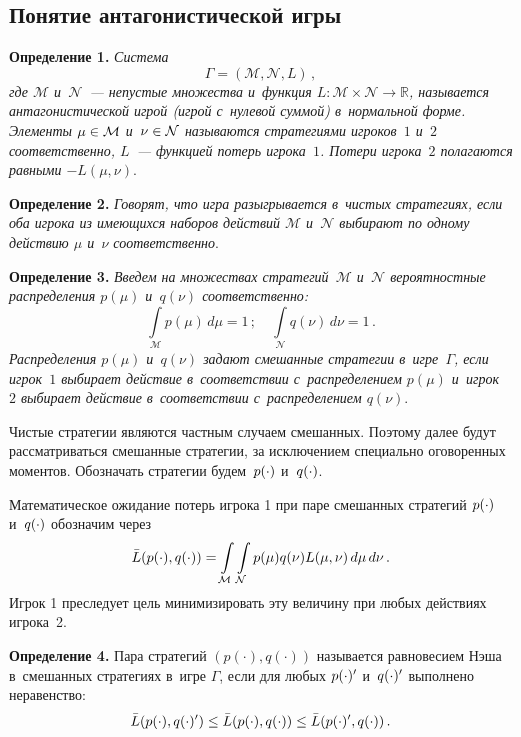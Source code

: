 \begin{multicols}{2}
\subsection{Понятие антагонистической игры}

\noindent
\textbf{Определение 1.} %
\textit{Система
$$
    \Gamma = (\mathcal{M}, \mathcal{N}, L)\,,
$$
где $\mathcal{M}$ и~$\mathcal{N}$~--- непустые множества и~функция $L \colon \mathcal{M}
\times \mathcal{N} \to \mathbb{R}$, называется антагонистической игрой
(игрой с~нулевой суммой) в~нормальной форме. Элементы $\mu \hm\in \mathcal{M}$
и~$\nu
\hm\in \mathcal{N}$ называются стратегиями игроков~$1$ и~$2$ соответственно,
$L$~--- функцией потерь игрока~$1$. Потери игрока~$2$ полагаются равными
$-L(\mu, \nu)$}.

\smallskip

\noindent
\textbf{Определение 2.} %
\textit{Говорят, что игра разыгрывается в~чис\-тых стратегиях, если оба
игрока из имеющихся наборов действий $\mathcal{M}$ и~$\mathcal{N}$ выбирают по одному
действию $\mu$ и~$\nu$ соответственно}.


\smallskip

\noindent
\textbf{Определение 3.}
\textit{Введем на множествах стратегий~$\mathcal{M}$ и~$\mathcal{N}$ вероятностные
распределения $p(\mu)$ и~$q(\nu)$ соответственно:
$$
    \int\limits_{\mathcal{M}} p(\mu)\, d\mu = 1\,; \quad
     \int\limits_{\mathcal{N}} q(\nu)\, d\nu =
    1\,.
$$
Распределения $p(\mu)$ и~$q(\nu)$ задают смешанные стратегии в~игре~$\Gamma$,
если игрок~$1$ выбирает действие в~соответствии с~распределением
$p(\mu)$ и~игрок~$2$ выбирает действие в~соответствии с~распределением $q(\nu)$}.

\smallskip


Чистые стратегии являются частным случаем смешанных. Поэтому далее
будут рассматриваться смешанные стратегии, за исключением
специально оговоренных моментов. Обозначать стратегии будем~$p(\cdot)$ и~$q(\cdot)$.

Математическое ожидание потерь игрока 1 при паре смешанных
стратегий $p(\cdot)$ и~$q(\cdot)$ обозначим через
$$
    \bar{L}(p(\cdot), q(\cdot)) = \int\limits_{\mathcal{M}} \int\limits_{\mathcal{N}} p(\mu) q(\nu) L(\mu,
    \nu)\, d\mu \, d\nu\,.
$$
Игрок 1 преследует цель минимизировать эту величину при любых
действиях игрока~2.

\noindent
\textbf{Определение 4.} %
Пара стратегий $(p(\cdot), q(\cdot))$ называется равновесием Нэша
в~смешанных стратегиях в~игре $\Gamma$, если для любых
$p(\cdot)^{\prime}$ и~$q(\cdot)^{\prime}$ выполнено неравенство:
$$
    \bar{L}(p(\cdot), q(\cdot)^{\prime}) \leq \bar{L}(p(\cdot), q(\cdot)) \leq \bar{L}(p(\cdot)^{\prime},
    q(\cdot))\,.
$$



\end{multicols}
